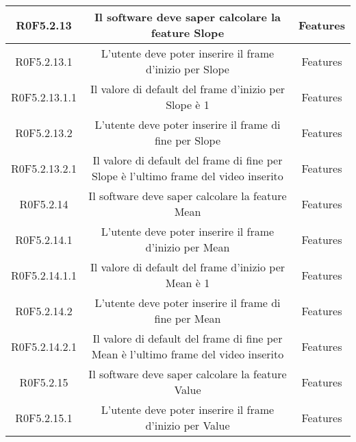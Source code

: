 \begin{center}
\begin{longtable}{|c|c|c|}
\hline
R0F5.2.13   & \parbox[t]{\larghezza}{Il software deve saper calcolare la feature\glossario{} Slope}  & \parbox[t]{\dimFonti}{ Features \\} \\
\hline
R0F5.2.13.1   & \parbox[t]{\larghezza}{L'utente deve poter inserire il frame d'inizio per Slope}  & \parbox[t]{\dimFonti}{ Features \\} \\
\hline
R0F5.2.13.1.1   & \parbox[t]{\larghezza}{Il valore di default del frame d'inizio per Slope è 1}  & \parbox[t]{\dimFonti}{ Features \\} \\
\hline
R0F5.2.13.2   & \parbox[t]{\larghezza}{L'utente deve poter inserire il frame di fine per Slope}  & \parbox[t]{\dimFonti}{ Features \\} \\
\hline
R0F5.2.13.2.1   & \parbox[t]{\larghezza}{Il valore di default del frame di fine per Slope è l'ultimo frame del video inserito}  & \parbox[t]{\dimFonti}{ Features \\} \\
\hline
R0F5.2.14   & \parbox[t]{\larghezza}{Il software deve saper calcolare la feature\glossario{} Mean}  & \parbox[t]{\dimFonti}{ Features \\} \\
\hline
R0F5.2.14.1   & \parbox[t]{\larghezza}{L'utente deve poter inserire il frame d'inizio per Mean}  & \parbox[t]{\dimFonti}{ Features \\} \\
\hline
R0F5.2.14.1.1   & \parbox[t]{\larghezza}{Il valore di default del frame d'inizio per Mean è 1}  & \parbox[t]{\dimFonti}{ Features \\} \\
\hline
R0F5.2.14.2   & \parbox[t]{\larghezza}{L'utente deve poter inserire il frame di fine per Mean}  & \parbox[t]{\dimFonti}{ Features \\} \\
\hline
R0F5.2.14.2.1   & \parbox[t]{\larghezza}{Il valore di default del frame di fine per Mean è l'ultimo frame del video inserito}  & \parbox[t]{\dimFonti}{ Features \\} \\
\hline
R0F5.2.15   & \parbox[t]{\larghezza}{Il software deve saper calcolare la feature\glossario{} Value}  & \parbox[t]{\dimFonti}{ Features \\} \\
\hline
R0F5.2.15.1   & \parbox[t]{\larghezza}{L'utente deve poter inserire il frame d'inizio per Value}  & \parbox[t]{\dimFonti}{ Features \\} \\

\end{longtable}
\end{center}
